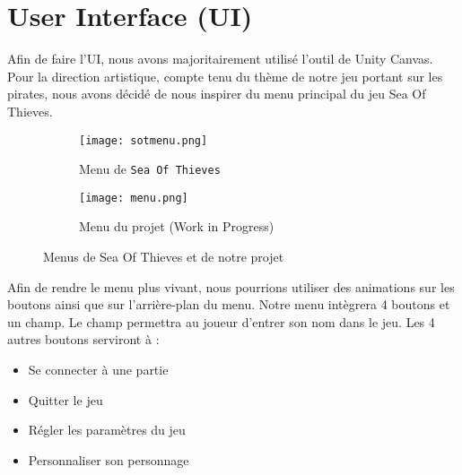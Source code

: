 \documentclass[../doc.tex]{subfiles}
\begin{document}
    \section{User Interface (UI)}
    Afin de faire l’UI, nous avons majoritairement utilisé l’outil de Unity Canvas. 
    Pour la direction artistique, compte tenu du thème de notre jeu portant sur les pirates, 
    nous avons décidé de nous inspirer du menu principal du jeu Sea Of Thieves. \newline
    
    \begin{figure}[!hbt]
        \centering
        \begin{subfigure}[t]{0.2\textwidth}
            \texttt{[image: sotmenu.png]} 
            \caption{Menu de \texttt{Sea Of Thieves}}
        \end{subfigure}
        \hspace{125pt}
        \begin{subfigure}[t]{0.3\textwidth}
            \texttt{[image: menu.png]}
            \caption{Menu du projet (Work in Progress)}
        \end{subfigure}
        \caption{Menus de Sea Of Thieves et de notre projet}
    \end{figure}
    
    Afin de rendre le menu plus vivant, 
    nous pourrions utiliser des animations sur les boutons ainsi que sur l’arrière-plan du menu. 
    Notre menu intègrera 4 boutons et un champ. Le champ permettra au joueur d’entrer son nom dans le jeu. \newline
    Les 4 autres boutons serviront à :
    \begin{itemize}
        \item Se connecter à une partie
        \item Quitter le jeu
        \item Régler les paramètres du jeu
        \item Personnaliser son personnage
    \end{itemize}
\end{document}
